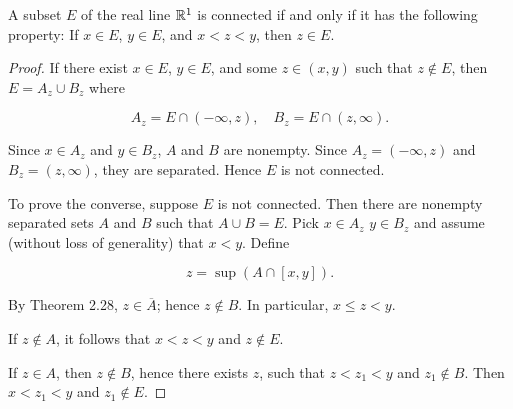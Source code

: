 \begin{thm}
    A subset $E$ of the real line ${\protect\mathbb R}^1$ is connected if and only if it has the following property: If $x \in E$, $y \in E$, and $x < z <y$, then $z \in E$.
\end{thm}

\begin{proof}
If there exist $x \in  E$, $y \in E$, and some $z \in (x, y)$ such that $z \not\in E$, then
$E = A_z \cup B_z$ where

\begin{equation*}
    A_z = E \cap (-\infty, z),\quad
    B_z = E \cap (z, \infty).
\end{equation*}


Since $x \in A_z$ and $y \in B_z$, $A$ and $B$ are nonempty. Since $A_z = (-\infty, z)$ and $B_z = (z, \infty)$, they are separated. Hence $E$ is not connected.

To prove the converse, suppose $E$ is not connected. Then there are
nonempty separated sets $A$ and $B$ such that $A \cup B=E$. Pick $x \in  A_z$ $y \in  B_z$
and assume (without loss of generality) that $x <y$. Define

\begin{equation*}
    z = \sup(A \cap [x, y]).
\end{equation*}

By Theorem 2.28, $z \in \overline{A}$; hence $z \not\in  B$. In particular, $x \leq z <y$.

If $z \not\in A$, it follows that $x < z < y$ and $z \not\in E$.

If $z \in  A$, then $z \not\in B$, hence there exists $z$, such that $z<z_1 <y$ and
$z_1 \not\in  B$. Then $x<z_1 <y$ and $z_1 \not\in  E$.
\end{proof}